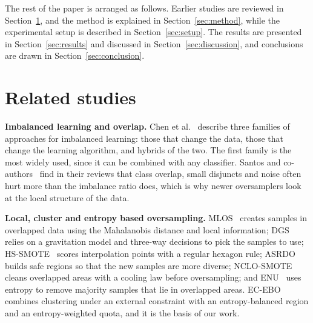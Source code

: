 \documentclass[preprint,10pt]{elsarticle}
\begin{document}
The rest of the paper is arranged as follows. Earlier studies are reviewed in Section~\ref{sec:related}, and the method is explained in Section~\ref{sec:method}, while the experimental setup is described in Section~\ref{sec:setup}. The results are presented in Section~\ref{sec:results} and discussed in Section~\ref{sec:discussion}, and conclusions are drawn in Section~\ref{sec:conclusion}.

\section{Related studies}\label{sec:related}
\textbf{Imbalanced learning and overlap.} \quad Chen et al.~\cite{chen2024} describe three families of approaches for imbalanced learning: those that change the data, those that change the learning algorithm, and hybrids of the two. The first family is the most widely used, since it can be combined with any classifier. Santos and co-authors~\cite{santos2022,santos2023} find in their reviews that class overlap, small disjuncts and noise often hurt more than the imbalance ratio does, which is why newer oversamplers look at the local structure of the data.

\textbf{Local, cluster and entropy based oversampling.} \quad MLOS~\cite{yan2025b} creates samples in overlapped data using the Mahalanobis distance and local information; DGS~\cite{yan2025a} relies on a gravitation model and three-way decisions to pick the samples to use; HS-SMOTE~\cite{wang2025} scores interpolation points with a regular hexagon rule; ASRDO~\cite{tao2024} builds safe regions so that the new samples are more diverse; NCLO-SMOTE~\cite{tao2025} cleans overlapped areas with a cooling law before oversampling; and ENU~\cite{kumar2024} uses entropy to remove majority samples that lie in overlapped areas. EC-EBO~\cite{tao2026} combines clustering under an external constraint with an entropy-balanced region and an entropy-weighted quota, and it is the basis of our work.
\end{document}
